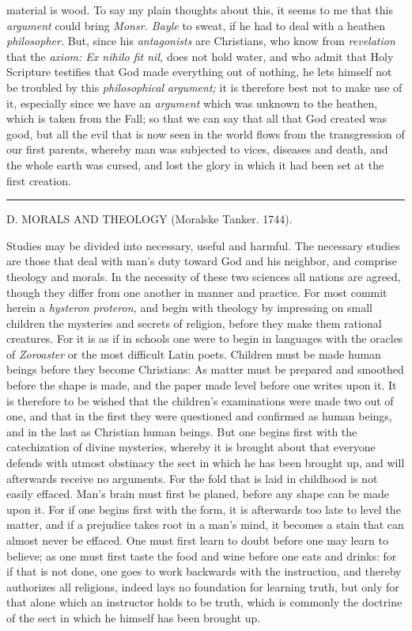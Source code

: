 \documentclass[12pt,a4paper,openany]{book}
\newcommand{\opage}[1]{\marginnote{\footnotesize\textit{[#1]}}}
\newcommand{\excerpthead}[1]{\par\bigskip\begin{center}#1\end{center}\nopagebreak\smallskip}
\newcommand{\sectionrule}{\par\begin{center}\rule{4em}{0.4pt}\end{center}}
\begin{document}
material is wood. To say my plain thoughts about this, it seems to me that this
\textit{argument} could bring \textit{Monsr. Bayle} to sweat, if he had to deal
with a heathen \textit{philosopher.} But, since his \textit{antagonists} are
Christians, who know from \textit{revelation} that the \textit{axiom: Ex nihilo
fit nil,} does not hold water, and who admit that Holy Scripture testifies that
God made everything out of nothing, he lets himself not be troubled by this
\textit{philosophical} \textit{argument;} it is therefore best not to make use of
it, especially since we have an \textit{argument} which was unknown to the
heathen, which is taken from the Fall; so that we can say that all that God
created was good, but all the evil that is now seen in the world flows from the
transgression of our first parents, whereby man was subjected to vices, diseases
and death, and the whole earth was cursed, and lost the glory in which it had
been set at the first creation.

\sectionrule

\excerpthead{D. MORALS AND THEOLOGY (Moralske Tanker. 1744).}

Studies may be divided into necessary, useful and harmful. The necessary studies
are those that deal with man's duty toward God and his neighbor, and comprise
theology and morals. In the necessity of these two sciences all nations are
agreed, though they differ from one another in manner and practice. For most
commit herein a \textit{hysteron proteron,} and begin with theology by impressing
on small children the mysteries and secrets of religion, before they make them
rational creatures. For it is as if in schools one were to begin in languages
with
\setcounter{footnote}{0}%
\opage{16}the oracles of \textit{Zoroaster} or the most difficult Latin poets.
Children must be made human beings before they become Christians: As matter must
be prepared and smoothed before the shape is made, and the paper made level
before one writes upon it. It is therefore to be wished that the children's
examinations were made two out of one, and that in the first they were
questioned and confirmed as human beings, and in the last as Christian human
beings. But one begins first with the catechization of divine mysteries, whereby
it is brought about that everyone defends with utmost obstinacy the sect in which
he has been brought up, and will afterwards receive no arguments. For the fold
that is laid in childhood is not easily effaced. Man's brain must first be
planed, before any shape can be made upon it. For if one begins first with the
form, it is afterwards too late to level the matter, and if a prejudice takes
root in a man's mind, it becomes a stain that can almost never be effaced. One
must first learn to doubt before one may learn to believe; as one must first
taste the food and wine before one eats and drinks: for if that is not done, one
goes to work backwards with the instruction, and thereby authorizes all
religions, indeed lays no foundation for learning truth, but only for that alone
which an instructor holds to be truth, which is commonly the doctrine of the
sect in which he himself has been brought up.
\end{document}
